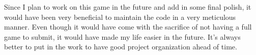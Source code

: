 \documentclass[conference,compsoc]{IEEEtran}
\begin{document}
Since I plan to work on this game in the future and add in some final polish, it would have been very beneficial to maintain the code in a very meticulous manner. Even though it would have come with the sacrifice of not having a full game to submit, it would have made my life easier in the future.
It's always better to put in the work to have good project organization ahead of time.

%
%

%
%

\end{document}
